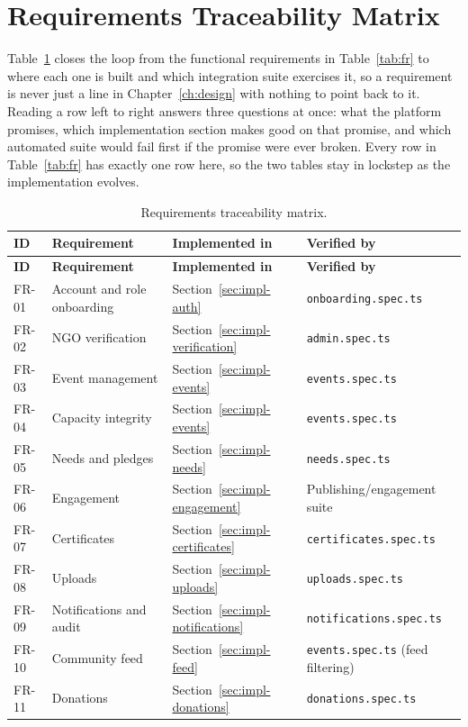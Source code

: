 \clearpage
\section{Requirements Traceability Matrix}
\label{sec:traceability}
Table~\ref{tab:traceability} closes the loop from the functional requirements in Table~\ref{tab:fr} to where each one is built and which integration suite exercises it, so a requirement is never just a line in Chapter~\ref{ch:design} with nothing to point back to it. Reading a row left to right answers three questions at once: what the platform promises, which implementation section makes good on that promise, and which automated suite would fail first if the promise were ever broken. Every row in Table~\ref{tab:fr} has exactly one row here, so the two tables stay in lockstep as the implementation evolves.

\begin{longtable}{|p{}|p{}|p{}|p{}|}
\caption{Requirements traceability matrix.}\label{tab:traceability}\\\hline
\textbf{ID} & \textbf{Requirement} & \textbf{Implemented in} & \textbf{Verified by}\\\hline
\endfirsthead
\hline
\textbf{ID} & \textbf{Requirement} & \textbf{Implemented in} & \textbf{Verified by}\\\hline
\endhead
FR-01 & Account and role onboarding & Section~\ref{sec:impl-auth} & \texttt{onboarding.spec.ts}\\\hline
FR-02 & NGO verification & Section~\ref{sec:impl-verification} & \texttt{admin.spec.ts}\\\hline
FR-03 & Event management & Section~\ref{sec:impl-events} & \texttt{events.spec.ts}\\\hline
FR-04 & Capacity integrity & Section~\ref{sec:impl-events} & \texttt{events.spec.ts}\\\hline
FR-05 & Needs and pledges & Section~\ref{sec:impl-needs} & \texttt{needs.spec.ts}\\\hline
FR-06 & Engagement & Section~\ref{sec:impl-engagement} & Publishing/engagement suite\\\hline
FR-07 & Certificates & Section~\ref{sec:impl-certificates} & \texttt{certificates.spec.ts}\\\hline
FR-08 & Uploads & Section~\ref{sec:impl-uploads} & \texttt{uploads.spec.ts}\\\hline
FR-09 & Notifications and audit & Section~\ref{sec:impl-notifications} & \texttt{notifications.spec.ts}\\\hline
FR-10 & Community feed & Section~\ref{sec:impl-feed} & \texttt{events.spec.ts} (feed filtering)\\\hline
FR-11 & Donations & Section~\ref{sec:impl-donations} & \texttt{donations.spec.ts}\\\hline
\end{longtable}

